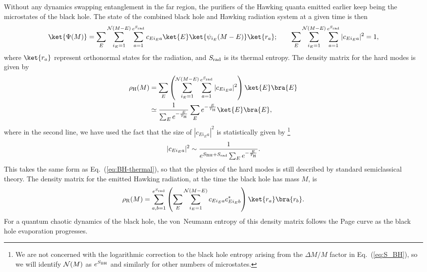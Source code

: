 \documentclass[12pt]{article}
\begin{document}
Without any dynamics swapping entanglement in the far region, 
the purifiers of the Hawking quanta emitted earlier keep being 
the microstates of the black hole.  The state of the combined 
black hole and Hawking radiation system at a given time is then
%
\begin{equation}
  \ket{\Psi(M)} = \sum_E \sum_{i_E = 1}^{{\cal N}(M-E)} 
    \sum_{a = 1}^{e^{S_{\rm rad}}} 
    c_{E i_E a} \ket{E} \ket{\psi_{i_E}(M-E)} \ket{r_a};
\qquad
  \sum_E \sum_{i_E = 1}^{{\cal N}(M-E)} 
    \sum_{a = 1}^{e^{S_{\rm rad}}} |c_{E i_E a}|^2 = 1,
\label{eq:BH-rad}
\end{equation}
%
where $\ket{r_a}$ represent orthonormal states for the radiation, 
and $S_{\rm rad}$ is its thermal entropy.  The density matrix for 
the hard modes is given by
%
\begin{align}
  \rho_{\rm H}(M) &= \sum_E \left( \sum_{i_E = 1}^{{\cal N}(M-E)} 
    \sum_{a = 1}^{e^{S_{\rm rad}}}  |c_{E i_E a}|^2 \right) 
    \ket{E} \bra{E}
\nonumber\\
  &\simeq \frac{1}{\sum_E e^{-\frac{E}{T_{\rm H}}}} 
    \sum_E e^{-\frac{E}{T_{\rm H}}} \ket{E} \bra{E},
\label{eq:rho_hard}
\end{align}
%
where in the second line, we have used the fact that the size of 
$|c_{E i_E a}|^2$ is statistically given by%
\footnote{We are not concerned with the logarithmic correction 
 to the black hole entropy arising from the $\varDelta M/M$ factor 
 in Eq.~(\ref{eq:S_BH}), so we will identify ${\cal N}(M)$ as 
 $e^{S_{\rm BH}}$ and similarly for other numbers of microstates.}
%
\begin{equation}
  |c_{E i_E a}|^2 \sim \frac{1}{e^{S_{\rm BH} + S_{\rm rad}} 
    \sum_E e^{-\frac{E}{T_{\rm H}}}}.
\label{eq:c_Eia}
\end{equation}
%
This takes the same form as Eq.~(\ref{eq:BH-thermal}), so that 
the physics of the hard modes is still described by standard 
semiclassical theory.  The density matrix for the emitted Hawking 
radiation, at the time the black hole has mass $M$, is
%
\begin{equation}
  \rho_{\rm R}(M) = \sum_{a,b = 1}^{e^{S_{\rm rad}}} 
    \left( \sum_E \sum_{i_E = 1}^{{\cal N}(M-E)} 
    c_{E i_E a} c^*_{E i_E b} \right) \ket{r_a} \bra{r_b}.
\label{eq:rho_rad}
\end{equation}
%
For a quantum chaotic dynamics of the black hole, the von~Neumann 
entropy of this density matrix follows the Page curve as the black 
hole evaporation progresses.
\end{document}
